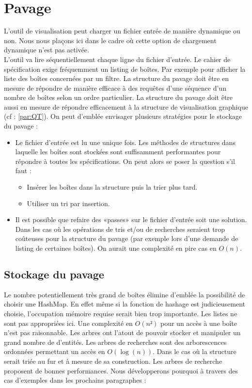 \section{Pavage}
L'outil de visualisation peut charger un fichier entrée de manière dynamique ou non. Nous nous plaçons ici dans le cadre où cette option de chargement dynamique n'est pas activée. \\ L'outil va lire séquentiellement chaque ligne du fichier d'entrée. Le cahier de spécification exige fréquemment un listing de boîtes. Par exemple pour afficher la liste des boîtes concernées par un filtre. La structure du pavage doit être en mesure de répondre de manière efficace à des requêtes d'une séquence d'un nombre de  boîtes selon un ordre particulier. La structure du pavage doit être aussi en mesure de répondre efficacement à la structure  de visualisation graphique (cf :  \ref{par:QT}). On peut d'emblée envisager plusieurs stratégies pour le stockage du pavage :

\begin{itemize}
\item
  Le fichier d'entrée est lu une unique fois. Les méthodes de structures dans laquelle les boîtes sont stockées sont suffisamment performantes pour répondre à toutes les spécifications. On peut alors se poser la question s'il faut :
  \begin{itemize}
  \item
    Insérer les boîtes dans la structure puis la trier plus tard.
  \item
    Utiliser un tri par insertion.
  \end{itemize}
\item
  Il est possible que refaire des «passes» sur le fichier d'entrée soit une solution. Dans les cas où les opérations de tris et/ou de recherches seraient trop coûteuses pour la structure du pavage (par exemple lors d'une demande de listing de certaines boîtes). On aurait une complexité en pire cas en $O(n)$. 
\end{itemize}
\subsection{Stockage du pavage}
Le nombre potentiellement très grand de boîtes élimine d'emblée la possibilité de choisir une HashMap. En effet même si la fonction de hashage est judicieusement choisie, l'occupation mémoire requise serait bien trop importante. Les listes ne sont pas  appropriées ici. Une complexité en $O(n²)$ pour un accès à une boîte n'est pas raisonnable. Les arbres ont l'atout de pouvoir stocker et manipuler un grand nombre de d'entités. Les arbres de recherches sont des arborescences ordonnées permettant un accès en $O(\log(n))$. Dans le cas où la structure serait triée au fur et à mesure de sa construction. Les arbres de recherche proposent de bonnes performances. Nous développerons pourquoi à travers des cas d'exemples dans les prochains paragraphes : 



